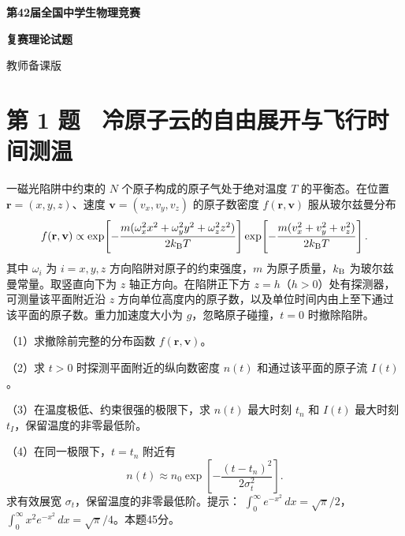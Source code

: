 \documentclass[12pt,a4paper,fontset=fandol]{ctexart}
\begin{document}
\begin{titlepage}
\thispagestyle{empty}
\vspace*{27mm}
\begin{center}
{\LARGE\bfseries 第42届全国中学生物理竞赛\par}
\vspace{8mm}
{\LARGE\bfseries 复赛理论试题\par}
\vspace{17mm}
{\Large 教师备课版\par}
\end{center}
\vfill
\end{titlepage}
\setcounter{page}{1}
\section{第 1
题　冷原子云的自由展开与飞行时间测温}\label{ux7b2c-1-ux9898-ux51b7ux539fux5b50ux4e91ux7684ux81eaux7531ux5c55ux5f00ux4e0eux98deux884cux65f6ux95f4ux6d4bux6e29}

一磁光陷阱中约束的 \(N\) 个原子构成的原子气处于绝对温度 \(T\)
的平衡态。在位置 \(\mathbf r=(x,y,z)\)、速度 \(\mathbf v=(v_x,v_y,v_z)\)
的原子数密度 \(f(\mathbf r,\mathbf v)\) 服从玻尔兹曼分布 \[
f(\mathbf r,\mathbf v)\propto
\exp\!\left[-\frac{m(\omega_x^2x^2+\omega_y^2y^2+\omega_z^2z^2)}{2k_{\rm B}T}\right]
\exp\!\left[-\frac{m(v_x^2+v_y^2+v_z^2)}{2k_{\rm B}T}\right].
\] 其中 \(\omega_i\) 为 \(i=x,y,z\) 方向陷阱对原子的约束强度，\(m\)
为原子质量，\(k_{\rm B}\) 为玻尔兹曼常量。取竖直向下为 \(z\)
轴正方向。在陷阱正下方 \(z=h\)（\(h>0\)）处有探测器，可测量该平面附近沿
\(z\)
方向单位高度内的原子数，以及单位时间内由上至下通过该平面的原子数。重力加速度大小为
\(g\)，忽略原子碰撞，\(t=0\) 时撤除陷阱。

（1）求撤除前完整的分布函数 \(f(\mathbf r,\mathbf v)\)。

（2）求 \(t>0\) 时探测平面附近的纵向数密度 \(n(t)\) 和通过该平面的原子流
\(I(t)\)。

（3）在温度极低、约束很强的极限下，求 \(n(t)\) 最大时刻 \(t_n\) 和
\(I(t)\) 最大时刻 \(t_I\)，保留温度的非零最低阶。

（4）在同一极限下，\(t=t_n\) 附近有 \[
n(t)\approx n_0\exp\!\left[-\frac{(t-t_n)^2}{2\sigma_t^2}\right].
\] 求有效展宽 \(\sigma_t\)，保留温度的非零最低阶。提示：
\(\int_0^\infty e^{-x^2}\,dx=\sqrt\pi/2\)，
\(\int_0^\infty x^2e^{-x^2}\,dx=\sqrt\pi/4\)。本题45分。
\end{document}
